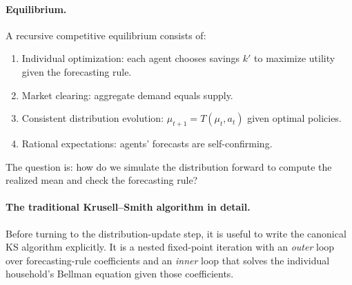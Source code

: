 \documentclass[11pt,a4paper]{report}
\begin{document}
\paragraph{Equilibrium.}
A recursive competitive equilibrium consists of:
\begin{enumerate}[itemsep=2pt]
\item Individual optimization: each agent chooses savings $k'$ to maximize utility given the forecasting rule.
\item Market clearing: aggregate demand equals supply.
\item Consistent distribution evolution: $\mu_{t+1} = T(\mu_t, a_t)$ given optimal policies.
\item Rational expectations: agents' forecasts are self-confirming.
\end{enumerate}

The question is: how do we simulate the distribution forward to compute the realized mean and check the forecasting rule?

\paragraph{The traditional Krusell--Smith algorithm in detail.}
Before turning to the distribution-update step, it is useful to write the canonical KS algorithm explicitly.  It is a nested fixed-point iteration with an \emph{outer} loop over forecasting-rule coefficients and an \emph{inner} loop that solves the individual household's Bellman equation given those coefficients.
\end{document}
